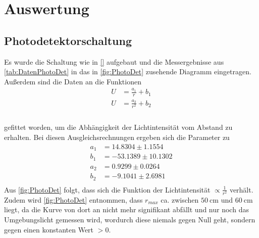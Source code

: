\section{Auswertung}
\label{sec:Auswertung}
\subsection{Photodetektorschaltung}
\label{subsec:PhotDet}
Es wurde die Schaltung wie in \autoref{} aufgebaut und die Messergebnisse aus \autoref{tab:DatenPhotoDet} in das in \autoref{fig:PhotoDet} zusehende Diagramm eingetragen.
Außerdem sind die Daten an die Funktionen
\begin{align*}
    U &= \frac{a_1}{r} + b_1\\
    U &= \frac{a_2}{r^2} + b_2\\
\end{align*}
\\
gefittet worden, um die Abhängigkeit der Lichtintensität vom Abstand zu erhalten. Bei diesen Ausgleichsrechnungen ergeben sich die Parameter zu
\begin{align*}
  a_1 &= 14.8304\pm 1.1554\\
  b_1 &= -53.1389\pm 10.1302\\
  a_2 &= 0.9299\pm 0.0264\\
  b_2 &= -9.1041\pm 2.6981\\
\end{align*}
Aus \autoref{fig:PhotoDet} folgt, dass sich die Funktion der Lichtintensität $\varpropto \frac{1}{r^2}$ verhält. Zudem wird \autoref{fig:PhotoDet}
entnommen, dass $r_{max}$ ca. zwischen $\SI{50}{\centi\meter}$ und $\SI{60}{\centi\meter}$ liegt, da die Kurve von dort an nicht mehr signifikant abfällt und nur noch
das Umgebungslicht gemessen wird, wordurch diese niemals gegen Null geht, sondern gegen einen konstanten Wert $>0$.
